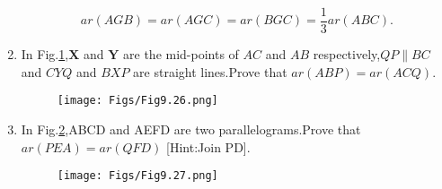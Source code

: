 \documentclass[12pt]{article}
\let\vec\mathbf
\begin{document}
\begin{enumerate}
\begin{equation}
	    ar (AGB) = ar (AGC) = ar (BGC) = \frac{1}{3} ar (ABC).    
    \end{equation}	
\item In Fig.\ref{fig:9.26},$\vec{X}$ and $\vec{Y}$ are the mid-points of $AC$ and $AB$ respectively,$QP \parallel BC$ and $CYQ$ and $BXP$ are straight lines.Prove that $ ar (ABP) = ar (ACQ) $.
\begin{figure}[h]
	\centering
	\texttt{[image: Figs/Fig9.26.png]}
	\caption{}
	\label{fig:9.26}
\end{figure}
\newpage
\item In Fig.\ref{fig:9.27},ABCD and AEFD are two parallelograms.Prove that $ ar (PEA) = ar (QFD) $ [Hint:Join PD].
\begin{figure}[h]
	\centering
	\texttt{[image: Figs/Fig9.27.png]}
	\caption{}
	\label{fig:9.27}
\end{figure}
\end{enumerate}
\end{document}
